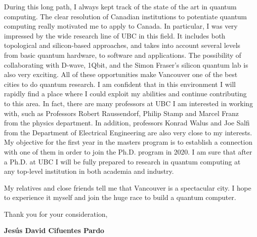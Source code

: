 \documentclass[12pt,a4paper,sans]{moderncv}        %
\begin{document}
During this long path, I always kept track of the state of the art in quantum computing. The clear resolution of Canadian institutions to potentiate quantum computing really motivated me to apply to Canada. In particular, I was very impressed by the wide research line of UBC in this field. It includes both topological and silicon-based approaches, and takes into account several levels from basic quantum hardware, to software and applications. The possibility of collaborating with D-wave, 1Qbit, and the Simon Fraser’s silicon quantum lab is also very exciting. All of these opportunities make Vancouver one of the best cities to do quantum research. I am confident that in this environment I will rapidly find a place where I could exploit my abilities and continue contributing to this area. In fact, there are many professors at UBC I am interested in working with, such as Professors Robert Raussendorf, Philip Stamp and  Marcel Franz from the physics department. In addition, professors Konrad Walus and Joe Salfi from the Department of  Electrical Engineering are also very close to my interests.  My objective for the first year in the masters program is to establish a connection with one of them in order to join the Ph.D. program in 2020. I am sure that after a Ph.D. at UBC I will be fully prepared to research in quantum computing at any top-level institution in both academia and industry.

My relatives and close friends tell me that Vancouver is a spectacular city. I hope to experience it myself and join the huge race to build a quantum computer.

Thank you for your consideration, 

\vspace{0.7cm}

\textbf{Jesús David Cifuentes Pardo}








\end{document}

